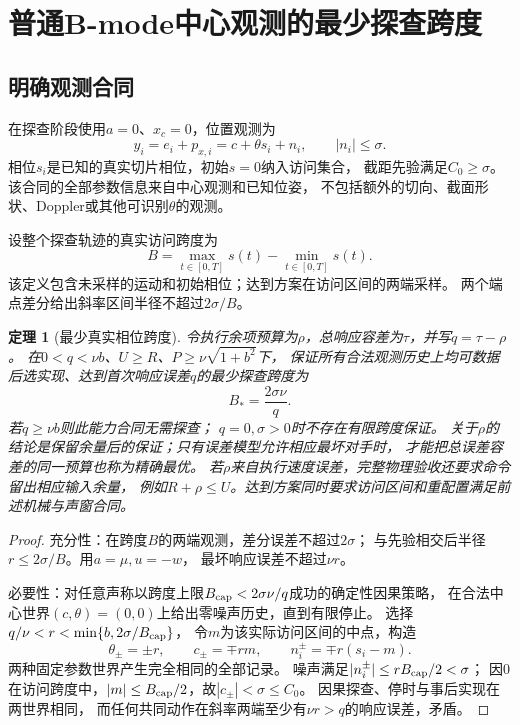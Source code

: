 \documentclass[11pt,a4paper]{article}
\numberwithin{equation}{section}
\newtheorem{theorem}{定理}[section]
\theoremstyle{definition}
\begin{document}
\section{普通B-mode中心观测的最少探查跨度}
\subsection{明确观测合同}
在探查阶段使用$a=0$、$x_c=0$，位置观测为
\begin{equation}
 y_i=e_i+p_{x,i}=c+\theta s_i+n_i,\qquad |n_i|\le\sigma.
 \label{eq:pixel}
\end{equation}
相位$s_i$是已知的真实切片相位，初始$s=0$纳入访问集合，
截距先验满足$C_0\ge\sigma$。
该合同的全部参数信息来自中心观测和已知位姿，
不包括额外的切向、截面形状、Doppler或其他可识别$\theta$的观测。

设整个探查轨迹的真实访问跨度为
\[
 B=\max_{t\in[0,T]}s(t)-\min_{t\in[0,T]}s(t).
\]
该定义包含未采样的运动和初始相位；达到方案在访问区间的两端采样。
两个端点差分给出斜率区间半径不超过$2\sigma/B$。

\begin{theorem}[最少真实相位跨度]
令执行余项预算为$\rho$，总响应容差为$\tau$，并写$q=\tau-\rho$。
在$0<q<\nu b$、$U\ge R$、$P\ge\nu\sqrt{1+b^2}$下，
保证所有合法观测历史上均可数据后选实现、达到首次响应误差$q$的最少探查跨度为
\begin{equation}
 \boxed{B_*=\frac{2\sigma\nu}{q}.}
 \label{eq:Bstar}
\end{equation}
若$q\ge\nu b$则此能力合同无需探查；
$q=0,\sigma>0$时不存在有限跨度保证。
关于$\rho$的结论是保留余量后的保证；只有误差模型允许相应最坏对手时，
才能把总误差容差的同一预算也称为精确最优。
若$\rho$来自执行速度误差，完整物理验收还要求命令留出相应输入余量，
例如$R+\rho\le U$。达到方案同时要求访问区间和重配置满足前述机械与声窗合同。
\end{theorem}
\begin{proof}
充分性：在跨度$B$的两端观测，差分误差不超过$2\sigma$；
与先验相交后半径$r\le2\sigma/B$。用$a=\mu,u=-w$，
最坏响应误差不超过$\nu r$。

必要性：对任意声称以跨度上限$B_{\rm cap}<2\sigma\nu/q$成功的确定性因果策略，
在合法中心世界$(c,\theta)=(0,0)$上给出零噪声历史，直到有限停止。
选择
$q/\nu<r<\min\{b,2\sigma/B_{\rm cap}\}$，
令$m$为该实际访问区间的中点，构造
\[
 \theta_\pm=\pm r,\qquad c_\pm=\mp rm,\qquad
 n_i^\pm=\mp r(s_i-m).
\]
两种固定参数世界产生完全相同的全部记录。
噪声满足$|n_i^\pm|\le rB_{\rm cap}/2<\sigma$；
因$0$在访问跨度中，$|m|\le B_{\rm cap}/2$，故$|c_\pm|<\sigma\le C_0$。
因果探查、停时与事后实现在两世界相同，
而任何共同动作在斜率两端至少有$\nu r>q$的响应误差，矛盾。
\end{proof}
\end{document}

